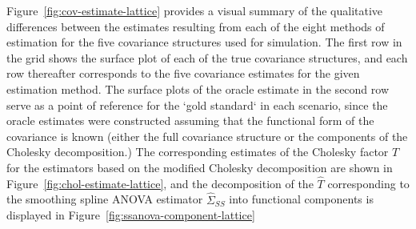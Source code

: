 \bigskip

Figure~\ref{fig:cov-estimate-lattice} provides a visual summary of the qualitative differences between the estimates resulting from each of the eight methods of estimation for the five covariance structures used for simulation. The first row in the grid shows the surface plot of each of the true covariance structures, and each row thereafter corresponds to the five covariance estimates for the given estimation method. The surface plots of the oracle estimate in the second row serve as a point of reference for the `gold standard` in each scenario, since the oracle estimates were constructed assuming that the functional form of the covariance is known (either the full covariance structure or the components of the Cholesky decomposition.) The corresponding estimates of the Cholesky factor $T$ for the estimators based on the modified Cholesky decomposition are shown in Figure~\ref{fig:chol-estimate-lattice}, and the decomposition of the $\hat{T}$ corresponding to the smoothing spline ANOVA estimator $\hat{\Sigma}_{SS}$ into functional components is displayed in Figure~\ref{fig:ssanova-component-lattice}

%

